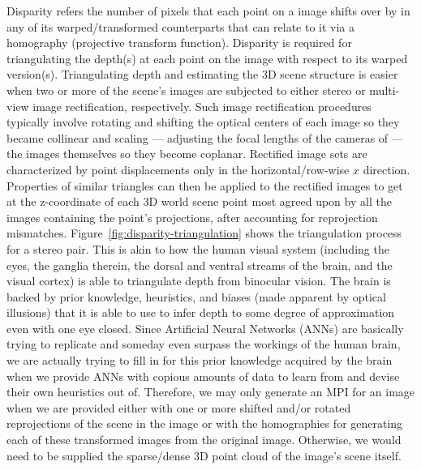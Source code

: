 Disparity refers the number of pixels that each point on a image shifts over by in any of its warped/transformed counterparts that can relate to it via a homography (projective transform function). Disparity is required for triangulating the depth(s) at each point on the image with respect to its warped version(s). Triangulating depth and estimating the 3D scene structure is easier when two or more of the scene's images are subjected to either stereo or multi-view image rectification, respectively. Such image rectification procedures typically involve rotating and shifting the optical centers of each image so they became collinear and scaling --- adjusting the focal lengths of the cameras of --- the images themselves so they become coplanar. Rectified image sets are characterized by point displacements only in the horizontal/row-wise $x$ direction. Properties of similar triangles can then be applied to the rectified images to get at the z-coordinate of each 3D world scene point most agreed upon by all the images containing the point's projections, after accounting for reprojection mismatches. Figure~\ref{fig:disparity-triangulation} shows the triangulation process for a stereo pair. This is akin to how the human visual system (including the eyes, the ganglia therein, the dorsal and ventral streams of the brain, and the visual cortex) is able to triangulate depth from binocular vision. The brain is backed by prior knowledge, heuristics, and biases (made apparent by optical illusions) that it is able to use to infer depth to some degree of approximation even with one eye closed. Since Artificial Neural Networks (ANNs) are basically trying to replicate and someday even surpass the workings of the human brain, we are actually trying to fill in for this prior knowledge acquired by the brain when we provide ANNs with copious amounts of data to learn from and devise their own heuristics out of. Therefore, we may only generate an MPI for an image when we are provided either with one or more shifted and/or rotated reprojections of the scene in the image or with the homographies for generating each of these transformed images from the original image. Otherwise, we would need to be supplied the sparse/dense 3D point cloud of the image's scene itself. 